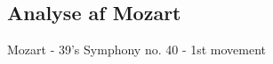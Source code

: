 \documentclass[12pt, letterpaper]{article}
\begin{document}
\subsection{Analyse af Mozart}
Mozart - 39's Symphony no. 40 - 1st movement
\begin{figure}[!h]
           \begin{floatrow}
           \end{floatrow}
\end{figure}
\end{document}
